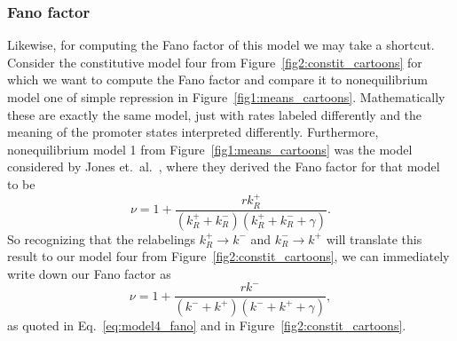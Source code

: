 \subsubsection{Fano factor}
Likewise, for computing the Fano factor of this model we may take a shortcut.
Consider the constitutive model four from Figure~\ref{fig2:constit_cartoons} for
which we want to compute the Fano factor and compare it to nonequilibrium model
one of simple repression in Figure~\ref{fig1:means_cartoons}. Mathematically
these are exactly the same model, just with rates labeled differently and the
meaning of the promoter states interpreted differently. Furthermore,
nonequilibrium model 1 from Figure~\ref{fig1:means_cartoons} was the model
considered by Jones et.\ al.~\cite{Jones2014}, where they derived the Fano
factor for that model to be
\begin{equation}
\nu = 1 + \frac{r k_R^+}{(k_R^+ + k_R^-)(k_R^+ + k_R^- + \gamma)}.
\end{equation}
So recognizing that the relabelings $k_R^+ \rightarrow k^-$ and
$k_R^- \rightarrow k^+$ will translate this result to our model four from
Figure~\ref{fig2:constit_cartoons}, we can immediately write down our Fano
factor as
\begin{equation}
\nu = 1 + \frac{r k^-}{(k^- + k^+)(k^- + k^+ + \gamma)},
\end{equation}
as quoted in Eq.~\ref{eq:model4_fano} and in Figure~\ref{fig2:constit_cartoons}.